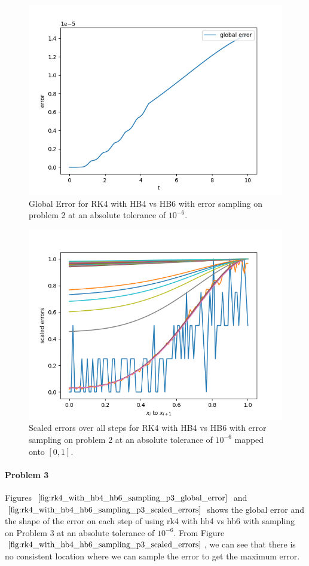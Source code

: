 \begin{figure}[H]
\centering
\includegraphics[width=0.7\linewidth]{./figures/rk4_with_hb4_hb6_sampling_p2_global_error}
\caption{Global Error for RK4 with HB4 vs HB6 with error sampling on problem 2 at an absolute tolerance of $10^{-6}$.}
\label{fig:rk4_with_hb4_hb6_sampling_p2_global_error}
\end{figure}

\begin{figure}[H]
\centering
\includegraphics[width=0.7\linewidth]{./figures/rk4_with_hb4_hb6_sampling_p2_scaled_errors}
\caption{Scaled errors over all steps for RK4 with HB4 vs HB6 with error sampling on problem 2 at an absolute tolerance of $10^{-6}$ mapped onto $[0, 1]$.}
\label{fig:rk4_with_hb4_hb6_sampling_p2_scaled_errors}
\end{figure}

\paragraph{Problem 3} Figures $\ref{fig:rk4_with_hb4_hb6_sampling_p3_global_error}$ and $\ref{fig:rk4_with_hb4_hb6_sampling_p3_scaled_errors}$ shows the global error and the shape of the error on each step of using rk4 with hb4 vs hb6 with sampling on Problem 3 at an absolute tolerance of $10^{-6}$. From Figure $\ref{fig:rk4_with_hb4_hb6_sampling_p3_scaled_errors}$, we can see that there is no consistent location where we can sample the error to get the maximum error.

